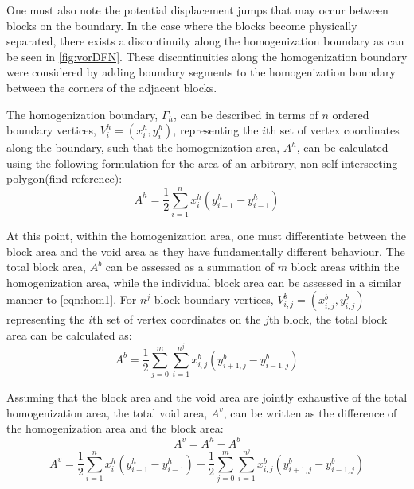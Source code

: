 One must also note the potential displacement jumps that may occur between blocks on the boundary. In the case where the blocks become physically separated, there exists a discontinuity along the homogenization boundary as can be seen in \ref{fig:vorDFN}. These discontinuities along the homogenization boundary were considered by adding boundary segments to the homogenization boundary between the corners of the adjacent blocks. 

The homogenization boundary, $\Gamma_{h}$, can be described in terms of $n$ ordered boundary vertices, $V_{i}^{h} = (x_{i}^{h}, y_{i}^{h})$, representing the $i$th set of vertex coordinates along the boundary, such that the homogenization area, $A^h$, can be calculated using the following formulation for the area of an arbitrary, non-self-intersecting polygon(find reference):
\begin{equation}
\label{eqn:hom1}
A^h = \dfrac{1}{2} \sum_{i=1}^{n}x_i^h(y_{i+1}^h-y_{i-1}^h)
\end{equation}

At this point, within the homogenization area, one must differentiate between the block area and the void area as they have fundamentally different behaviour. The total block area, $A^b$ can be assessed as a summation of $m$ block areas within the homogenization area, while the individual block area can be assessed in a similar manner to \ref{eqn:hom1}. For $n^j$ block boundary vertices, $V_{i,j}^{b} = (x_{i,j}^{b}, y_{i,j}^{b})$ representing the $i$th set of vertex coordinates on the $j$th block, the total block area can be calculated as:
\begin{equation}
\label{eqn:hom2}
A^b = \dfrac{1}{2} \sum_{j=0}^{m} \sum_{i=1}^{n^j} x_{i,j}^b(y_{i+1,j}^b-y_{i-1,j}^b)
\end{equation}

Assuming that the block area and the void area are jointly exhaustive of the total homogenization area, the total void area, $A^v$, can be written as the difference of the homogenization area and the block area:
\begin{equation}
\label{eqn:hom3}
A^v = A^h - A^b
\end{equation}
\begin{equation}
\label{eqn:hom4}
A^v = \dfrac{1}{2} \sum_{i=1}^{n}x_i^h(y_{i+1}^h-y_{i-1}^h) - \dfrac{1}{2} \sum_{j=0}^{m} \sum_{i=1}^{n^j} x_{i,j}^b(y_{i+1,j}^b-y_{i-1,j}^b)
\end{equation}


